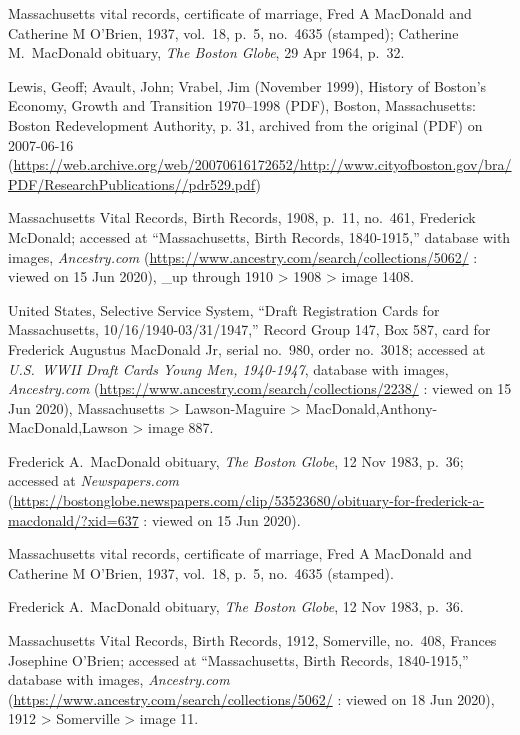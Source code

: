 \begin{thebibliography}{999}
Massachusetts vital records, certificate of marriage, Fred A MacDonald and Catherine M O'Brien, 1937, vol.\ 18, p.\ 5, no.\ 4635 (stamped); Catherine M.\ MacDonald obituary, \textit{The Boston Globe}, 29 Apr 1964, p.\ 32.

Lewis, Geoff; Avault, John; Vrabel, Jim (November 1999), History of Boston's Economy, Growth and Transition 1970–1998 (PDF), Boston, Massachusetts: Boston Redevelopment Authority, p. 31, archived from the original (PDF) on 2007-06-16 (\url{https://web.archive.org/web/20070616172652/http://www.cityofboston.gov/bra/PDF/ResearchPublications//pdr529.pdf})

Massachusetts Vital Records, Birth Records, 1908, p.\ 11, no.\ 461, Frederick McDonald; accessed at ``Massachusetts, Birth Records, 1840-1915,'' database with images, \textit{Ancestry.com} (\url{https://www.ancestry.com/search/collections/5062/} : viewed on 15 Jun 2020), \_up through 1910 > 1908 > image 1408.

United States, Selective Service System, ``Draft Registration Cards for Massachusetts, 10/16/1940-03/31/1947,'' Record Group 147, Box 587, card for Frederick Augustus MacDonald Jr, serial no.\ 980, order no.\ 3018; accessed at \textit{U.S.\ WWII Draft Cards Young Men, 1940-1947}, database with images, \textit{Ancestry.com} (\url{https://www.ancestry.com/search/collections/2238/} : viewed on 15 Jun 2020), Massachusetts > Lawson-Maguire > MacDonald,Anthony-MacDonald,Lawson > image 887.

Frederick A.\ MacDonald obituary, \textit{The Boston Globe}, 12 Nov 1983, p.\ 36; accessed at \textit{Newspapers.com} (\url{https://bostonglobe.newspapers.com/clip/53523680/obituary-for-frederick-a-macdonald/?xid=637} : viewed on 15 Jun 2020).

Massachusetts vital records, certificate of marriage, Fred A MacDonald and Catherine M O'Brien, 1937, vol.\ 18, p.\ 5, no.\ 4635 (stamped).

Frederick A.\ MacDonald obituary, \textit{The Boston Globe}, 12 Nov 1983, p.\ 36.


Massachusetts Vital Records, Birth Records, 1912, Somerville, no.\ 408, Frances Josephine O'Brien; accessed at ``Massachusetts, Birth Records, 1840-1915,'' database with images, \textit{Ancestry.com} (\url{https://www.ancestry.com/search/collections/5062/} : viewed on 18 Jun 2020), 1912 > Somerville > image 11.


\end{thebibliography}
